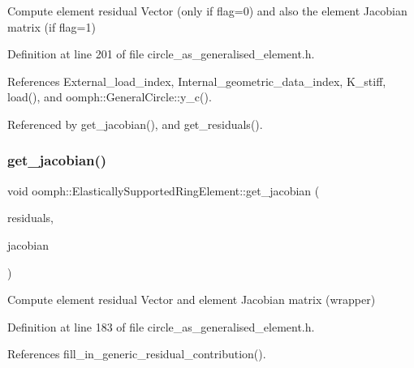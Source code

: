 Compute element residual Vector (only if flag=0) and also the element Jacobian matrix (if flag=1) 



Definition at line 201 of file circle\+\_\+as\+\_\+generalised\+\_\+element.\+h.



References External\+\_\+load\+\_\+index, Internal\+\_\+geometric\+\_\+data\+\_\+index, K\+\_\+stiff, load(), and oomph\+::\+General\+Circle\+::y\+\_\+c().



Referenced by get\+\_\+jacobian(), and get\+\_\+residuals().

\mbox{\label{classoomph_1_1ElasticallySupportedRingElement_a2418f706f5b17a64a5b01b72ccb3b95d}} 
\subsubsection{\texorpdfstring{get\+\_\+jacobian()}{get\_jacobian()}}
{\footnotesize\ttfamily void oomph\+::\+Elastically\+Supported\+Ring\+Element\+::get\+\_\+jacobian (\begin{DoxyParamCaption}\item[{Vector$<$ double $>$ \&}]{residuals,  }\item[{Dense\+Matrix$<$ double $>$ \&}]{jacobian }\end{DoxyParamCaption})\hspace{0.3cm}{\ttfamily [inline]}}



Compute element residual Vector and element Jacobian matrix (wrapper) 



Definition at line 183 of file circle\+\_\+as\+\_\+generalised\+\_\+element.\+h.



References fill\+\_\+in\+\_\+generic\+\_\+residual\+\_\+contribution().

\mbox{\label{classoomph_1_1ElasticallySupportedRingElement_ad8bf518168d68e8b016e474e76037a49}} 
